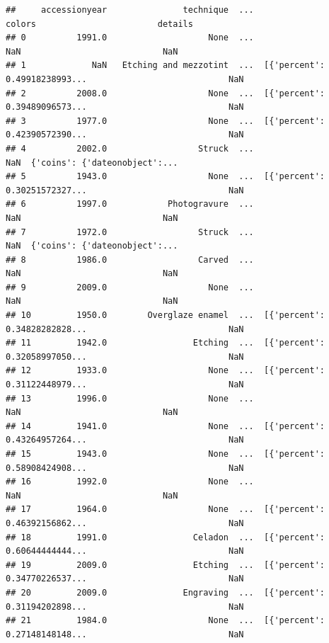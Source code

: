 \documentclass[]{book}
\begin{document}
\begin{verbatim}
##     accessionyear               technique  ...                         colors                        details
## 0          1991.0                    None  ...                            NaN                            NaN
## 1             NaN   Etching and mezzotint  ...  [{'percent': 0.49918238993...                            NaN
## 2          2008.0                    None  ...  [{'percent': 0.39489096573...                            NaN
## 3          1977.0                    None  ...  [{'percent': 0.42390572390...                            NaN
## 4          2002.0                  Struck  ...                            NaN  {'coins': {'dateonobject':...
## 5          1943.0                    None  ...  [{'percent': 0.30251572327...                            NaN
## 6          1997.0            Photogravure  ...                            NaN                            NaN
## 7          1972.0                  Struck  ...                            NaN  {'coins': {'dateonobject':...
## 8          1986.0                  Carved  ...                            NaN                            NaN
## 9          2009.0                    None  ...                            NaN                            NaN
## 10         1950.0        Overglaze enamel  ...  [{'percent': 0.34828282828...                            NaN
## 11         1942.0                 Etching  ...  [{'percent': 0.32058997050...                            NaN
## 12         1933.0                    None  ...  [{'percent': 0.31122448979...                            NaN
## 13         1996.0                    None  ...                            NaN                            NaN
## 14         1941.0                    None  ...  [{'percent': 0.43264957264...                            NaN
## 15         1943.0                    None  ...  [{'percent': 0.58908424908...                            NaN
## 16         1992.0                    None  ...                            NaN                            NaN
## 17         1964.0                    None  ...  [{'percent': 0.46392156862...                            NaN
## 18         1991.0                 Celadon  ...  [{'percent': 0.60644444444...                            NaN
## 19         2009.0                 Etching  ...  [{'percent': 0.34770226537...                            NaN
## 20         2009.0               Engraving  ...  [{'percent': 0.31194202898...                            NaN
## 21         1984.0                    None  ...  [{'percent': 0.27148148148...                            NaN

\end{verbatim}
\end{document}
